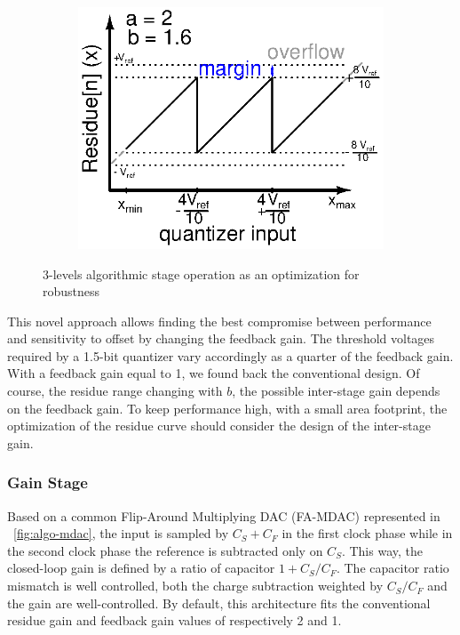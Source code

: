 \begin{figure}[htp]
\begin{subfigure}[b]{0.32\textwidth}
		\label{fig:algo-21}
	\end{subfigure}
	\begin{subfigure}[b]{0.32\textwidth}
		\centering
		\includegraphics[width=\textwidth]{Chapter4/Figs/3-levels-pattern-algo-2-1_6.ps}
		\label{fig:algo-21-6}
	\end{subfigure}
	\caption{3-levels algorithmic stage operation as an optimization for robustness}
	\label{fig:algo-quantizer}
\end{figure}

This novel approach allows finding the best compromise between performance and sensitivity to offset by changing the feedback gain. The threshold voltages required by a 1.5-bit quantizer vary accordingly as a quarter of the feedback gain. With a feedback gain equal to 1, we found back the conventional design. Of course, the residue range changing with $b$, the possible inter-stage gain depends on the feedback gain. To keep performance high, with a small area footprint, the optimization of the residue curve should consider the design of the inter-stage gain.

	\subsubsection{Gain Stage}              %
	\label{sec:algo_gain_stage}
Based on a common Flip-Around Multiplying DAC (FA-MDAC) represented in \figurename~\ref{fig:algo-mdac}, the input is sampled by \(C_S+C_F\) in the first clock phase while in the second clock phase the reference is subtracted only on \(C_S\). This way, the closed-loop gain is defined by a ratio of capacitor \(1+C_S/C_F\). The capacitor ratio mismatch is well controlled, both the charge subtraction weighted by \(C_S/C_F\) and the gain are well-controlled. By default, this architecture fits the conventional residue gain and feedback gain values of respectively 2 and 1.

